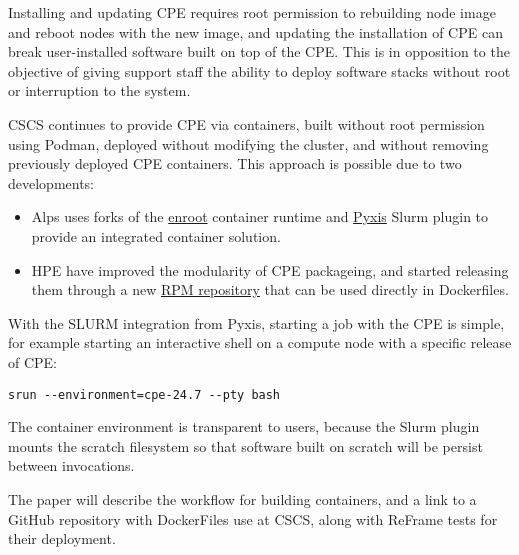Installing and updating CPE requires root permission to rebuilding node image and reboot nodes with the new image, and updating the installation of CPE can break user-installed software built on top of the CPE.
This is in opposition to the objective of giving support staff the ability to deploy software stacks without root or interruption to the system.

CSCS continues to provide CPE via containers, built without root permission using Podman, deployed without modifying the cluster, and without removing previously deployed CPE containers.
This approach is possible due to two developments:
\begin{itemize}
       \item Alps uses forks of the \href{https://github.com/NVIDIA/enroot}{enroot} container runtime and \href{https://github.com/NVIDIA/pyxis}{Pyxis} Slurm plugin to provide an integrated container solution.
       \item HPE have improved the modularity of CPE packageing, and started releasing them through a new \href{https://cpe.ext.hpe.com/docs/latest/install/installation-guidance-container.html}{RPM repository} that can be used directly in Dockerfiles.
\end{itemize}


With the SLURM integration from Pyxis, starting a job with the CPE is simple, for example starting an interactive shell on a compute node with a specific release of CPE:
\begin{lstlisting}
srun --environment=cpe-24.7 --pty bash
\end{lstlisting}
The container environment is transparent to users, because the Slurm plugin mounts the scratch filesystem so that software built on scratch will be persist between invocations.

The paper will describe the workflow for building containers, and a link to a GitHub repository with DockerFiles use at CSCS, along with ReFrame tests for their deployment.
